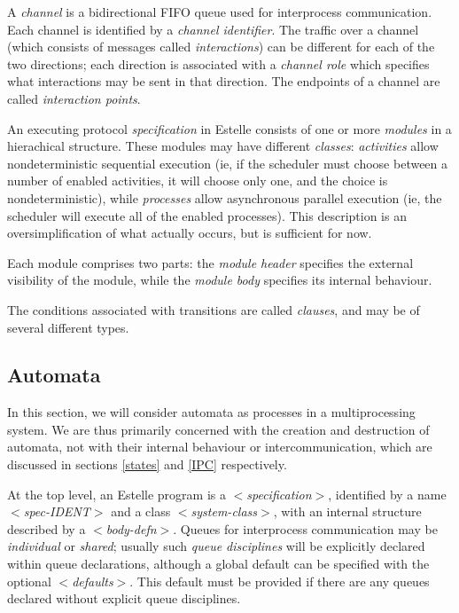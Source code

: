 A {\em channel} is a bidirectional FIFO queue used for
interprocess communication. Each channel is identified by a
{\em channel identifier}. The traffic over a channel (which
consists of messages called {\em interactions}) can be different
for each of the two directions; each direction is associated
with a {\em channel role} which specifies what interactions may be
sent in that direction. The endpoints of a channel are
called {\em interaction points}.
 
An executing protocol {\em specification} in Estelle consists
of one or more {\em modules} in a hierachical structure. These
modules may have different {\em classes}: {\em activities} allow
nondeterministic sequential execution (ie, if the scheduler
must choose between a number of enabled activities, it will
choose only one, and the choice is nondeterministic), while
{\em processes} allow asynchronous parallel execution (ie, the
scheduler will execute all of the enabled processes). This
description is an oversimplification of what actually
occurs, but is sufficient for now.
 
Each module comprises two parts: the {\em module header}
specifies the external visibility of the module, while the
{\em module body} specifies its internal behaviour.
 
The conditions associated with transitions are called
{\em clauses}, and may be of several different types.

\subsection[Automata]{Automata}
\label{automata}

In this section, we will consider automata as processes
in a multiprocessing system. We are thus primarily
concerned with the creation and destruction of automata, not
with their internal behaviour or intercommunication, which
are discussed in sections \ref{states} and \ref{IPC} respectively.
 
At the top level, an Estelle program is a
$<${\em specification}$>$, identified by a name $<${\em spec-IDENT}$>$ and a
class $<${\em system-class}$>$, with an internal structure described
by a $<${\em body-defn}$>$. Queues for interprocess communication may
be {\em individual} or {\em shared}; usually such {\em queue
disciplines} will
be explicitly declared within queue declarations, although a
global default can be specified with the optional
$<${\em defaults}$>$. This default must be provided if there are any
queues declared without explicit queue disciplines.
 
